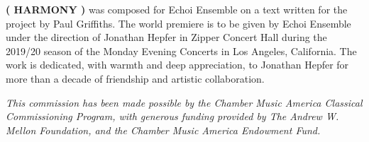 \textbf{( HARMONY )} was composed for Echoi Ensemble on a text written for the
project by Paul Griffiths. The world premiere is to be given by Echoi Ensemble
under the direction of Jonathan Hepfer in Zipper Concert Hall during the
2019/20 season of the Monday Evening Concerts in Los Angeles, California. The
work is dedicated, with warmth and deep appreciation, to Jonathan Hepfer for
more than a decade of friendship and artistic collaboration.

\textit{This commission has been made possible by the Chamber Music America
Classical Commissioning Program, with generous funding provided by The Andrew
W. Mellon Foundation, and the Chamber Music America Endowment Fund.}
